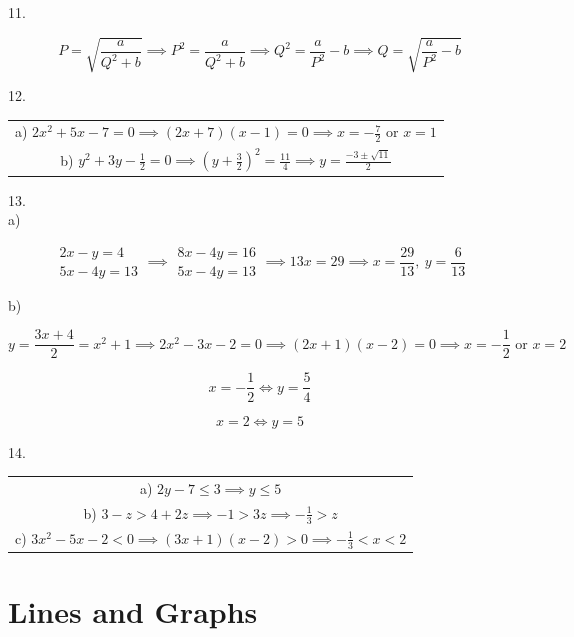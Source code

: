 \documentclass{article}
\begin{document}
11.

$$
  P = \sqrt{\frac{a}{Q^2+b}} \implies P^2 = \frac{a}{Q^2+b} \implies Q^2 = \frac{a}{P^2}-b \implies Q=\sqrt{\frac{a}{P^2}-b}
$$

12.

\begin{center}
  \begin{tabular}{ c }
    a) $2x^2+5x-7=0 \implies (2x+7)(x-1)=0 \implies x=-\frac{7}{2} \text{ or } x=1$ \\
    b) $y^2+3y-\frac{1}{2}=0 \implies \left( y+\frac{3}{2} \right)^2=\frac{11}{4} \implies y=\frac{-3\pm\sqrt{11}}{2}$
  \end{tabular}
\end{center}

13.\\
\indent
\quad a)

$$
  \begin{matrix}
    2x-y=4 \\
    5x-4y=13
  \end{matrix}
  \implies
  \begin{matrix}
    8x-4y=16 \\
    5x-4y=13
  \end{matrix}
  \implies 13x=29 \implies x=\frac{29}{13},\: y=\frac{6}{13}
$$

\indent
\quad b)

$$
  y = \frac{3x+4}{2} = x^2+1 \implies 2x^2-3x-2=0 \implies (2x+1)(x-2) = 0 \implies x=-\frac{1}{2}\text{ or }x=2
$$

$$
  x=-\frac{1}{2} \iff y=\frac{5}{4}
$$

$$
  x=2 \iff y=5
$$

14.

\begin{center}
  \begin{tabular}{ c }
    a) $2y-7 \leq 3 \implies y \leq 5$ \\
    b) $3-z > 4+2z \implies -1 > 3z \implies -\frac{1}{3}>z$ \\
    c) $3x^2-5x-2<0 \implies (3x+1)(x-2)>0 \implies -\frac{1}{3}<x<2$
  \end{tabular}
\end{center}

\clearpage

\section{Lines and Graphs}

\clearpage
\end{document}
